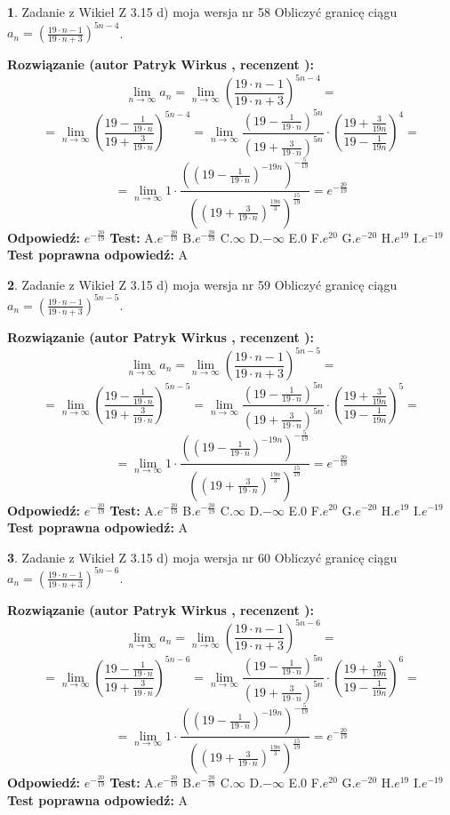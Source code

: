 \documentclass[12pt, a4paper]{article}
\theoremstyle{definition} %
\newtheorem{zad}{}
\newcommand{\zadStart}[1]{\begin{zad}#1\newline}
\newcommand{\zadStop}{\end{zad}}
\newcommand{\rozwStart}[2]{\noindent \textbf{Rozwiązanie (autor #1 , recenzent #2): }\newline}
\newcommand{\rozwStop}{\newline}
\newcommand{\odpStart}{\noindent \textbf{Odpowiedź:}\newline}
\newcommand{\odpStop}{\newline}
\newcommand{\testStart}{\noindent \textbf{Test:}\newline}
\newcommand{\testStop}{\newline}
\newcommand{\kluczStart}{\noindent \textbf{Test poprawna odpowiedź:}\newline}
\newcommand{\kluczStop}{\newline}
\begin{document}
\zadStart{Zadanie z Wikieł Z 3.15 d) moja wersja nr 58}
Obliczyć granicę ciągu $a_{n}=(\frac{19\cdot n - 1}{19 \cdot n + 3})^{5n-4}$.
\zadStop
\rozwStart{Patryk Wirkus}{}
$$\lim\limits_{n\to\infty} a_{n} = \lim\limits_{n\to\infty}(\frac{19\cdot n - 1}{19 \cdot n + 3})^{5n-4}=$$
$$=\lim\limits_{n\to\infty}(\frac{19 - \frac{1}{19\cdot n}}{19 + \frac{3}{19 \cdot n}})^{5n-4}=\lim\limits_{n\to\infty}\frac{(19 - \frac{1}{19\cdot n})^{5n}}{(19 + \frac{3}{19\cdot n})^{5n}} \cdot (\frac{19+\frac{3}{19n}}{19-\frac{1}{19n}})^{4}=$$
$$=\lim\limits_{n\to\infty} 1 \cdot \frac{((19-\frac{1}{19 \cdot n})^{-19n})^{-\frac{5}{19}}}{((19+\frac{3}{19 \cdot n})^{\frac{19n}{3}})^{\frac{15}{19}}} =e^{-\frac{20}{19}}$$
\rozwStop
\odpStart
$e^{-\frac{20}{19}}$
\odpStop
\testStart
A.$ e^{-\frac{20}{19}}$
B.$ e^{-\frac{20}{19}}$
C.$\infty$
D.$-\infty$
E.$0$
F.$e^{20}$
G.$e^{-20}$
H.$e^{19}$
I.$e^{-19}$
\testStop
\kluczStart
A
\kluczStop



\zadStart{Zadanie z Wikieł Z 3.15 d) moja wersja nr 59}
Obliczyć granicę ciągu $a_{n}=(\frac{19\cdot n - 1}{19 \cdot n + 3})^{5n-5}$.
\zadStop
\rozwStart{Patryk Wirkus}{}
$$\lim\limits_{n\to\infty} a_{n} = \lim\limits_{n\to\infty}(\frac{19\cdot n - 1}{19 \cdot n + 3})^{5n-5}=$$
$$=\lim\limits_{n\to\infty}(\frac{19 - \frac{1}{19\cdot n}}{19 + \frac{3}{19 \cdot n}})^{5n-5}=\lim\limits_{n\to\infty}\frac{(19 - \frac{1}{19\cdot n})^{5n}}{(19 + \frac{3}{19\cdot n})^{5n}} \cdot (\frac{19+\frac{3}{19n}}{19-\frac{1}{19n}})^{5}=$$
$$=\lim\limits_{n\to\infty} 1 \cdot \frac{((19-\frac{1}{19 \cdot n})^{-19n})^{-\frac{5}{19}}}{((19+\frac{3}{19 \cdot n})^{\frac{19n}{3}})^{\frac{15}{19}}} =e^{-\frac{20}{19}}$$
\rozwStop
\odpStart
$e^{-\frac{20}{19}}$
\odpStop
\testStart
A.$ e^{-\frac{20}{19}}$
B.$ e^{-\frac{20}{19}}$
C.$\infty$
D.$-\infty$
E.$0$
F.$e^{20}$
G.$e^{-20}$
H.$e^{19}$
I.$e^{-19}$
\testStop
\kluczStart
A
\kluczStop



\zadStart{Zadanie z Wikieł Z 3.15 d) moja wersja nr 60}
Obliczyć granicę ciągu $a_{n}=(\frac{19\cdot n - 1}{19 \cdot n + 3})^{5n-6}$.
\zadStop
\rozwStart{Patryk Wirkus}{}
$$\lim\limits_{n\to\infty} a_{n} = \lim\limits_{n\to\infty}(\frac{19\cdot n - 1}{19 \cdot n + 3})^{5n-6}=$$
$$=\lim\limits_{n\to\infty}(\frac{19 - \frac{1}{19\cdot n}}{19 + \frac{3}{19 \cdot n}})^{5n-6}=\lim\limits_{n\to\infty}\frac{(19 - \frac{1}{19\cdot n})^{5n}}{(19 + \frac{3}{19\cdot n})^{5n}} \cdot (\frac{19+\frac{3}{19n}}{19-\frac{1}{19n}})^{6}=$$
$$=\lim\limits_{n\to\infty} 1 \cdot \frac{((19-\frac{1}{19 \cdot n})^{-19n})^{-\frac{5}{19}}}{((19+\frac{3}{19 \cdot n})^{\frac{19n}{3}})^{\frac{15}{19}}} =e^{-\frac{20}{19}}$$
\rozwStop
\odpStart
$e^{-\frac{20}{19}}$
\odpStop
\testStart
A.$ e^{-\frac{20}{19}}$
B.$ e^{-\frac{20}{19}}$
C.$\infty$
D.$-\infty$
E.$0$
F.$e^{20}$
G.$e^{-20}$
H.$e^{19}$
I.$e^{-19}$
\testStop
\kluczStart
A
\kluczStop
\end{document}
